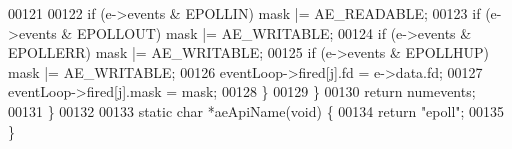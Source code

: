 \begin{DoxyCode}
00121 
00122             \textcolor{keywordflow}{if} (e->events & EPOLLIN) mask |= AE\_READABLE;
00123             \textcolor{keywordflow}{if} (e->events & EPOLLOUT) mask |= AE\_WRITABLE;
00124             \textcolor{keywordflow}{if} (e->events & EPOLLERR) mask |= AE\_WRITABLE;
00125             \textcolor{keywordflow}{if} (e->events & EPOLLHUP) mask |= AE\_WRITABLE;
00126             eventLoop->fired[j].fd = e->data.fd;
00127             eventLoop->fired[j].mask = mask;
00128         \}
00129     \}
00130     \textcolor{keywordflow}{return} numevents;
00131 \}
00132 
00133 \textcolor{keyword}{static} \textcolor{keywordtype}{char} *aeApiName(\textcolor{keywordtype}{void}) \{
00134     \textcolor{keywordflow}{return} \textcolor{stringliteral}{"epoll"};
00135 \}
\end{DoxyCode}
